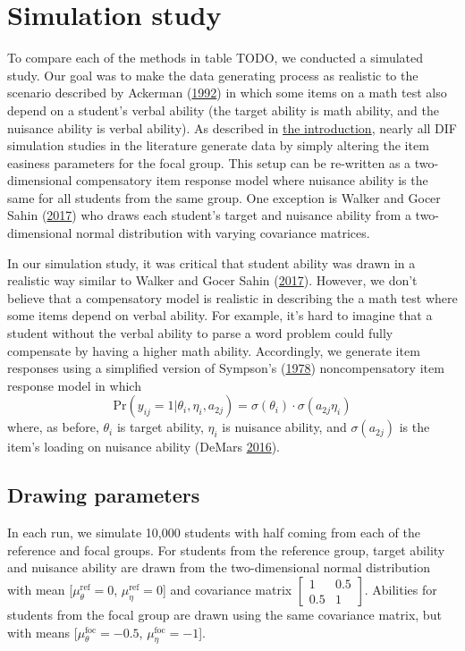 \documentclass[
  11pt,
]{article}
\begin{document}
\hypertarget{simulation-study}{%
\section{Simulation study}\label{simulation-study}}

To compare each of the methods in table TODO, we conducted a simulated study. Our goal was to make the data generating process as realistic to the scenario described by Ackerman (\protect\hyperlink{ref-ackerman1992didactic}{1992}) in which some items on a math test also depend on a student's verbal ability (the target ability is math ability, and the nuisance ability is verbal ability). As described in \protect\hyperlink{intro}{the introduction}, nearly all DIF simulation studies in the literature generate data by simply altering the item easiness parameters for the focal group. This setup can be re-written as a two-dimensional compensatory item response model where nuisance ability is the same for all students from the same group. One exception is Walker and Gocer Sahin (\protect\hyperlink{ref-walker2017using}{2017}) who draws each student's target and nuisance ability from a two-dimensional normal distribution with varying covariance matrices.

In our simulation study, it was critical that student ability was drawn in a realistic way similar to Walker and Gocer Sahin (\protect\hyperlink{ref-walker2017using}{2017}). However, we don't believe that a compensatory model is realistic in describing the a math test where some items depend on verbal ability. For example, it's hard to imagine that a student without the verbal ability to parse a word problem could fully compensate by having a higher math ability. Accordingly, we generate item responses using a simplified version of Sympson's (\protect\hyperlink{ref-sympson1978model}{1978}) noncompensatory item response model in which
\[
\text{Pr}(y_{ij} = 1 | \theta_i, \eta_i, a_{2j}) = \sigma(\theta_i) \cdot \sigma(a_{2j}\eta_i)
\]
where, as before, \(\theta_i\) is target ability, \(\eta_i\) is nuisance ability, and \(\sigma(a_{2j})\) is the item's loading on nuisance ability (DeMars \protect\hyperlink{ref-demars2016partially}{2016}).

\hypertarget{drawing-parameters}{%
\subsection{Drawing parameters}\label{drawing-parameters}}

In each run, we simulate 10,000 students with half coming from each of the reference and focal groups. For students from the reference group, target ability and nuisance ability are drawn from the two-dimensional normal distribution with mean {[}\(\mu_\theta^\text{ref} = 0\), \(\mu_\eta^\text{ref} = 0\){]} and covariance matrix \(\begin{bmatrix} 1 & 0.5 \\ 0.5 & 1 \end{bmatrix}\). Abilities for students from the focal group are drawn using the same covariance matrix, but with means {[}\(\mu_\theta^\text{foc} = -0.5\), \(\mu_\eta^\text{foc} = -1\){]}.
\end{document}
